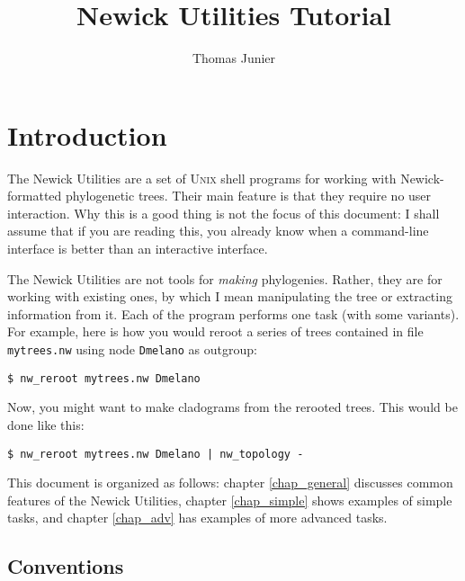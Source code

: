 \documentclass[a4paper,10pt]{report}
\title{Newick Utilities Tutorial}
\author{Thomas Junier}
\newcommand{\nutils}{Newick Utilities}
\newcommand{\unix}{\textsc{Unix}}
\begin{document}
\maketitle
\tableofcontents

\chapter{Introduction}

The \nutils{} are a set of \unix{} shell programs for working with Newick-formatted phylogenetic trees. Their main feature is that they require no user interaction. Why this is a good thing is not the focus of this document: I shall assume that if you are reading this, you already know when a command-line interface is better than an interactive interface.

The \nutils{} are not tools for \emph{making} phylogenies. Rather, they are for working with existing ones, by which I mean manipulating the tree or extracting information from it. Each of the program performs one task (with some variants). For example, here is how you would reroot a series of trees contained in file \texttt{mytrees.nw} using node \texttt{Dmelano} as outgroup:
\begin{verbatim}
$ nw_reroot mytrees.nw Dmelano
\end{verbatim} 
Now, you might want to make cladograms from the rerooted trees. This would be done like this:
\begin{verbatim}
$ nw_reroot mytrees.nw Dmelano | nw_topology -
\end{verbatim}

This document is organized as follows: chapter \ref{chap_general} discusses common features of the \nutils, chapter \ref{chap_simple} shows examples of simple tasks, and chapter \ref{chap_adv} has examples of more advanced tasks.

\section{Conventions}
\end{document}
